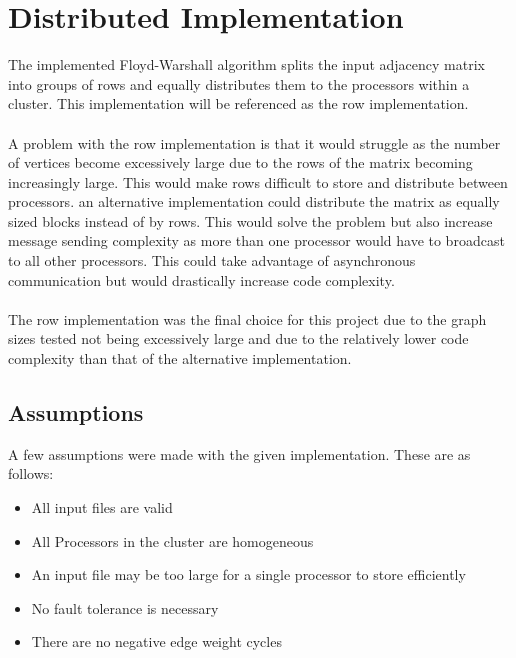 \documentclass[12pt]{article}
\begin{document}
\section{Distributed Implementation}
The implemented Floyd-Warshall algorithm splits the input adjacency matrix into groups of rows and equally distributes them to the processors within a cluster. This implementation will be referenced as the row implementation.
\\\\ 
A problem with the row implementation is that it would struggle as the number of vertices become excessively large due to the rows of the matrix becoming increasingly large. This would make rows difficult to store and distribute between processors. an alternative implementation could distribute the matrix as equally sized blocks instead of by rows. This would solve the problem but also increase message sending complexity as more than one processor would have to broadcast to all other processors. This could take advantage of asynchronous communication but would drastically increase code complexity.
\\\\
The row implementation was the final choice for this project due to the graph sizes tested not being excessively large and due to the relatively lower code complexity than that of the alternative implementation.

\subsection{Assumptions}
A few assumptions were made with the given implementation. These are as follows:
\begin{itemize}
    \item All input files are valid
    \item All Processors in the cluster are homogeneous
    \item An input file may be too large for a single processor to store efficiently
    \item No fault tolerance is necessary
    \item There are no negative edge weight cycles
\end{itemize}
\end{document}
